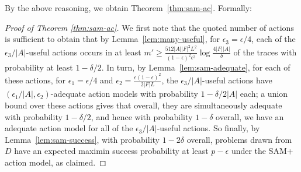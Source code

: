\documentclass[letterpaper]{article} %
\begin{document}
\noindent
By the above reasoning, we obtain Theorem~\ref{thm:sam-ac}. 
Formally:

\begin{proof}[Proof of Theorem \ref{thm:sam-ac}]
We first note that the quoted number of actions is sufficient to obtain that by Lemma~\ref{lem:many-useful}, for $\epsilon_3 = \epsilon/4$, each of the $\epsilon_3/|A|$-useful actions occurs in at least $m'\geq \frac{512 |A||F|^2L^2}{(1-\epsilon)^2\epsilon^3}\log\frac{4|F||A|}{\delta}$ of the traces with probability at least $1-\delta/2$. In turn, by Lemma~\ref{lem:sam-adequate}, for each of these actions, for $\epsilon_1 = \epsilon/4$ and $\epsilon_2 = \frac{\epsilon(1-\epsilon)^2}{2|F|L}$, the $\epsilon_3/|A|$-useful actions have $(\epsilon_1/|A|,\epsilon_2)$-adequate action models with probability $1-\delta/2|A|$ each; a union bound over these actions gives that overall, they are simultaneously adequate with probability $1-\delta/2$, and hence with probability $1-\delta$ overall, we have an adequate action model for all of the $\epsilon_3/|A|$-useful actions. So finally, by Lemma~\ref{lem:sam-success}, with probability $1-2\delta$ overall, problems drawn from $D$ have an expected maximin success probability at least $p-\epsilon$ under the SAM+ action model, as claimed.
\end{proof}
\end{document}
